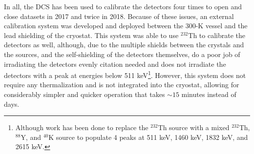 In all, the DCS has been used to calibrate the detectors four times to open and close datasets in 2017 and twice in 2018.
Because of these issues, an external calibration system was developed and deployed between the 300-K vessel and the lead shielding of the cryostat.
This system was able to use $^{232}$Th to calibrate the detectors as well, although, due to the multiple shields between the crystals and the sources, and the self-shielding of the detectors themselves, do a poor job of irradiating the detectors evenly\color{red} citation needed \color{black} and does not irradiate the detectors with a peak at energies below 511 keV\footnote{Although work has been done to replace the $^{232}$Th source with a mixed $^{232}$Th, $^{88}$Y, and $^{40}$K source to populate 4 peaks at 511 keV, 1460 keV, 1832 keV, and 2615 keV.}.
However, this system does not require any thermalization and is not integrated into the cryostat, allowing for considerably simpler and quicker operation that takes $\sim15$ minutes instead of days.

